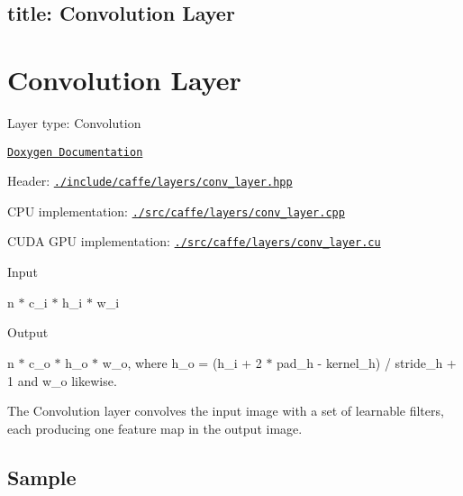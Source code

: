

 \subsection*{title\+: Convolution Layer }

\section*{Convolution Layer}


\begin{DoxyItemize}
\item Layer type\+: {\ttfamily Convolution}
\item \href{http://caffe.berkeleyvision.org/doxygen/classcaffe_1_1ConvolutionLayer.html}{\tt Doxygen Documentation}
\item Header\+: \href{https://github.com/BVLC/caffe/blob/master/include/caffe/layers/conv_layer.hpp}{\tt {\ttfamily ./include/caffe/layers/conv\+\_\+layer.hpp}}
\item C\+PU implementation\+: \href{https://github.com/BVLC/caffe/blob/master/src/caffe/layers/conv_layer.cpp}{\tt {\ttfamily ./src/caffe/layers/conv\+\_\+layer.cpp}}
\item C\+U\+DA G\+PU implementation\+: \href{https://github.com/BVLC/caffe/blob/master/src/caffe/layers/conv_layer.cu}{\tt {\ttfamily ./src/caffe/layers/conv\+\_\+layer.cu}}
\item Input
\begin{DoxyItemize}
\item {\ttfamily n $\ast$ c\+\_\+i $\ast$ h\+\_\+i $\ast$ w\+\_\+i}
\end{DoxyItemize}
\item Output
\begin{DoxyItemize}
\item {\ttfamily n $\ast$ c\+\_\+o $\ast$ h\+\_\+o $\ast$ w\+\_\+o}, where {\ttfamily h\+\_\+o = (h\+\_\+i + 2 $\ast$ pad\+\_\+h -\/ kernel\+\_\+h) / stride\+\_\+h + 1} and {\ttfamily w\+\_\+o} likewise.
\end{DoxyItemize}
\end{DoxyItemize}

The {\ttfamily Convolution} layer convolves the input image with a set of learnable filters, each producing one feature map in the output image.

\subsection*{Sample}

